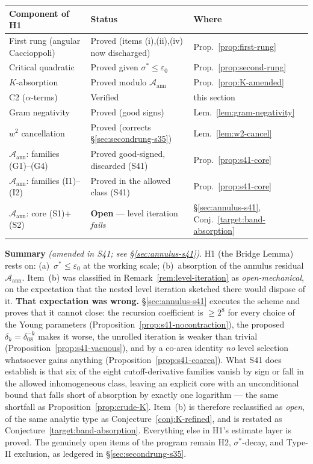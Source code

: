 \documentclass[11pt]{article}
\theoremstyle{definition}
\theoremstyle{remark}
\begin{document}
\begin{center}
\begin{tabular}{lll}
\hline
Component of H1 & Status & Where \\
\hline
First rung (angular Caccioppoli) & Proved (items (i),(ii),(iv) now discharged) & Prop.~\ref{prop:first-rung} \\
Critical quadratic & Proved given $\sigma^*\leq\varepsilon_0$ & Prop.~\ref{prop:second-rung} \\
$K$-absorption & Proved modulo $\mathcal{A}_{\mathrm{ann}}$ & Prop.~\ref{prop:K-amended} \\
C2 ($\alpha$-terms) & Verified & this section \\
Gram negativity & Proved (good signs) & Lem.~\ref{lem:gram-negativity} \\
$w^2$ cancellation & Proved (corrects \S\ref{sec:secondrung-s35}) & Lem.~\ref{lem:w2-cancel} \\
$\mathcal{A}_{\mathrm{ann}}$: families (G1)--(G4) & Proved good-signed, discarded (S41) & Prop.~\ref{prop:s41-core} \\
$\mathcal{A}_{\mathrm{ann}}$: families (I1)--(I2) & Proved in the allowed class (S41) & Prop.~\ref{prop:s41-core} \\
$\mathcal{A}_{\mathrm{ann}}$: core (S1)+(S2) & \textbf{Open} --- level iteration \emph{fails} & \S\ref{sec:annulus-s41}, Conj.~\ref{target:band-absorption} \\
\hline
\end{tabular}
\end{center}

\noindent\textbf{Summary} \emph{(amended in S41; see
\S\ref{sec:annulus-s41})}. H1 (the Bridge Lemma) rests on:
(a)~$\sigma^*\leq\varepsilon_0$ at the working scale;
(b)~absorption of the annulus residual $\mathcal{A}_{\mathrm{ann}}$.
Item~(b) was classified in Remark~\ref{rem:level-iteration} as
\emph{open-mechanical}, on the expectation that the nested level iteration
sketched there would dispose of it. \textbf{That expectation was wrong.}
\S\ref{sec:annulus-s41} executes the scheme and proves that it cannot
close: the recursion coefficient is $\geq2^{8}$ for every choice of the
Young parameters (Proposition~\ref{prop:s41-nocontraction}), the proposed
$\delta_k=\delta_08^{-k}$ makes it worse, the unrolled iteration is weaker
than trivial (Proposition~\ref{prop:s41-vacuous}), and by a co-area
identity \emph{no} level selection whatsoever gains anything
(Proposition~\ref{prop:s41-coarea}). What S41 does establish is that six of
the eight cutoff-derivative families vanish by sign or fall in the allowed
inhomogeneous class, leaving an explicit core with an unconditional bound
that falls short of absorption by exactly one logarithm --- the same
shortfall as Proposition~\ref{prop:crude-K}. Item~(b) is therefore
reclassified as \emph{open}, of the same analytic type as
Conjecture~\ref{conj:K-refined}, and is restated as
Conjecture~\ref{target:band-absorption}. Everything else in H1's estimate
layer is proved. The genuinely open items of the program remain H2,
$\sigma^*$-decay, and Type-II exclusion, as ledgered in
\S\ref{sec:secondrung-s35}.
\end{document}
